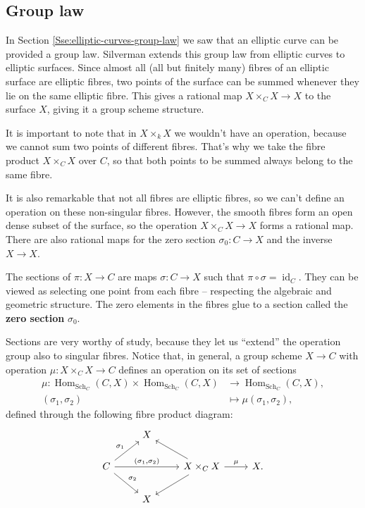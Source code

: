 \documentclass{report}
\DeclareMathOperator{\id}{id}
\DeclareMathOperator{\Hom}{Hom}
\DeclareMathOperator{\Sch}{Sch}
\theoremstyle{definition}
\begin{document}
\subsection{Group law}

In Section \ref{Sse:elliptic-curves-group-law} we saw that an elliptic curve can be provided a group law. Silverman \cite[Section~III.3]{silverman1994advanced} extends this group law from elliptic curves to elliptic surfaces. Since almost all (all but finitely many) fibres of an elliptic surface are elliptic fibres, two points of the surface can be summed whenever they lie on the same elliptic fibre. This gives a rational map $X\times_CX\rightarrow X$ to the surface $X$, giving it a group scheme structure.

It is important to note that in $X\times_kX$ we wouldn't have an operation, because we cannot sum two points of different fibres. That's why we take the fibre product $X\times_CX$ over $C$, so that both points to be summed always belong to the same fibre.

It is also remarkable that not all fibres are elliptic fibres, so we can't define an operation on these non-singular fibres. However, the smooth fibres form an open dense subset of the surface, so the operation $X\times_CX\rightarrow X$ forms a rational map. There are also rational maps for the zero section $\sigma_0:C\rightarrow X$ and the inverse $X\rightarrow X$.

The sections of $\pi:X\rightarrow C$ are maps $\sigma:C\rightarrow X$ such that $\pi\circ\sigma=\id_C$. They can be viewed as selecting one point from each fibre -- respecting the algebraic and geometric structure. The zero elements in the fibres glue to a section called the \textbf{zero section} $\sigma_0$.

Sections are very worthy of study, because they let us ``extend'' the operation group also to singular fibres. Notice that, in general, a group scheme $X\rightarrow C$ with operation $\mu:X\times_CX\rightarrow C$ defines an operation on its set of sections
\begin{align*}
\mu:\Hom_{\Sch_C}(C,X)\times\Hom_{\Sch_C}(C,X)&\longrightarrow\Hom_{\Sch_C}(C,X),\\
(\sigma_1,\sigma_2)&\longmapsto\mu(\sigma_1,\sigma_2),
\end{align*}
defined through the following fibre product diagram:
\[
\begin{tikzcd}
&X\\
C\arrow[ru,"\sigma_1"]\arrow[rd,"\sigma_2"]\arrow[rr,"{(\sigma_1,\sigma_2)}"]&&X\times_CX\arrow[lu]\arrow[ld]\arrow[r,"\mu"]&X.\\
&X
\end{tikzcd}
\]
\end{document}
